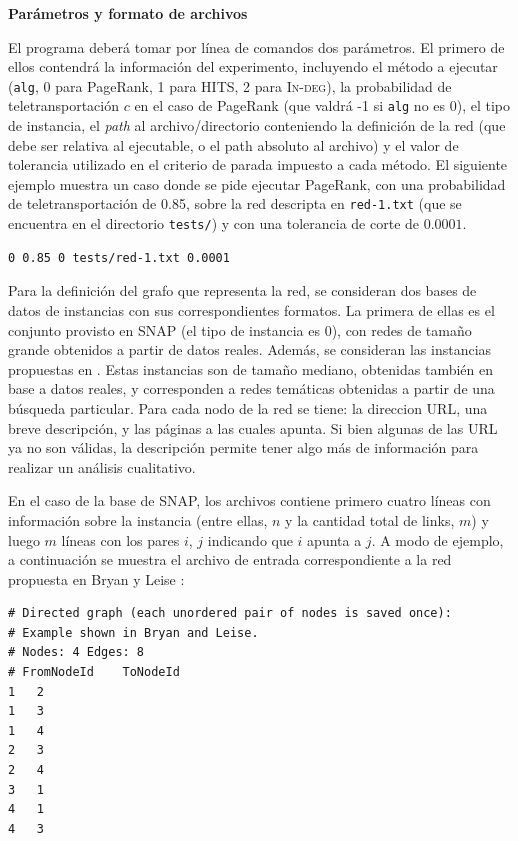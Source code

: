 \vskip 5pt
\noindent\textbf{Par\'ametros y formato de archivos}
\vskip 5pt

El programa deber\'a tomar por l\'inea de comandos dos par\'ametros. El primero de ellos contendr\'a la informaci\'on del experimento, incluyendo
el m\'etodo a ejecutar (\verb+alg+, 0 para PageRank, 1 para HITS, 2 para \textsc{In-deg}), la probabilidad de teletransportaci\'on $c$ en el caso
de PageRank (que valdr\'a -1 si \verb+alg+ no es 0), el tipo de instancia, el \emph{path} al archivo/directorio conteniendo la definici\'on de la red (que debe ser relativa
al ejecutable, o el path absoluto al archivo) y el valor de 
tolerancia utilizado en el criterio de parada impuesto a cada m\'etodo. El siguiente ejemplo muestra un caso donde se pide ejecutar PageRank, con una
probabilidad de teletransportaci\'on de 0.85, sobre la red descripta en \verb+red-1.txt+ (que se encuentra en el directorio \verb+tests/+) y con una 
tolerancia de corte de $0.0001$.
\begin{verbatim}
0 0.85 0 tests/red-1.txt 0.0001
\end{verbatim}

Para la definici\'on del grafo que representa la red, se consideran dos bases de datos de instancias con sus correspondientes formatos. La primera
de ellas es el conjunto provisto en SNAP \cite{SNAP} (el tipo de instancia es 0), con redes de tama\~no grande obtenidos a partir de datos reales. Adem\'as, se consideran las 
instancias propuestas en \cite{dataset}. Estas instancias son de tama\~no mediano, obtenidas tambi\'en en base a datos reales, y corresponden a redes
tem\'aticas obtenidas a partir de una b\'usqueda particular. Para cada nodo de la red se tiene: la direccion URL, una breve descripci\'on, y las 
p\'aginas a las cuales apunta. Si bien algunas de las URL ya no son v\'alidas, la descripci\'on permite tener algo m\'as de informaci\'on para 
realizar un an\'alisis cualitativo.

En el caso de la base de SNAP, los archivos contiene primero cuatro l\'ineas con informaci\'on sobre la instancia (entre ellas, $n$ y la cantidad
total de links, $m$) y luego $m$ l\'ineas con los pares $i$, $j$ indicando que $i$ apunta a $j$. A modo de ejemplo, a continuaci\'on se muestra el 
archivo de entrada correspondiente a la red propuesta en Bryan y Leise \cite[Figura 1]{Bryan2006}: 

\begin{verbatim}
# Directed graph (each unordered pair of nodes is saved once): 
# Example shown in Bryan and Leise.
# Nodes: 4 Edges: 8 
# FromNodeId    ToNodeId
1   2
1   3
1   4
2   3
2   4
3   1
4   1
4   3
\end{verbatim}


